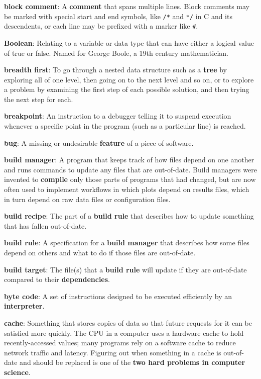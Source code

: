 \documentclass[krantzl]{krantz}
\newcommand{\glosskey}[1]{\textbf{#1}}
\begin{document}
\noindent \textbf{\glosskey{block comment}}: 
A \glosskey{comment} that spans multiple lines. Block comments may be marked with special start and end symbols, like \texttt{/*} and \texttt{*/} in C and its descendents, or each line may be prefixed with a marker like \texttt{\#}.


\noindent \textbf{\glosskey{Boolean}}: 
Relating to a variable or data type that can have either a logical value of true or false. Named for George Boole, a 19th century mathematician.


\noindent \textbf{\glosskey{breadth first}}: 
To go through a nested data structure such as a \glosskey{tree} by exploring all of one level, then going on to the next level and so on, or to explore a problem by examining the first step of each possible solution, and then trying the next step for each.


\noindent \textbf{\glosskey{breakpoint}}: 
An instruction to a debugger telling it to suspend execution whenever a specific point in the program (such as a particular line) is reached.


\noindent \textbf{\glosskey{bug}}: 
A missing or undesirable \glosskey{feature} of a piece of software.


\noindent \textbf{\glosskey{build manager}}: 
A program that keeps track of how files depend on one another and runs commands to update any files that are out-of-date. Build managers were invented to \glosskey{compile} only those parts of programs that had changed, but are now often used to implement workflows in which plots depend on results files, which in turn depend on raw data files or configuration files.


\noindent \textbf{\glosskey{build recipe}}: 
The part of a \glosskey{build rule} that describes how to update something that has fallen out-of-date.


\noindent \textbf{\glosskey{build rule}}: 
A specification for a \glosskey{build manager} that describes how some files depend on others and what to do if those files are out-of-date.


\noindent \textbf{\glosskey{build target}}: 
The file(s) that a \glosskey{build rule} will update if they are out-of-date compared to their \glosskey{dependencies}.


\noindent \textbf{\glosskey{byte code}}: 
A set of instructions designed to be executed efficiently by an \glosskey{interpreter}.


\noindent \textbf{\glosskey{cache}}: 
Something that stores copies of data so that future requests for it can be satisfied more quickly. The CPU in a computer uses a hardware cache to hold recently-accessed values; many programs rely on a software cache to reduce network traffic and latency. Figuring out when something in a cache is out-of-date and should be replaced is one of the \glosskey{two hard problems in computer science}.
\end{document}
